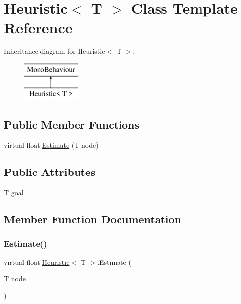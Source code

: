 \hypertarget{class_heuristic}{}\section{Heuristic$<$ T $>$ Class Template Reference}
\label{class_heuristic}
Inheritance diagram for Heuristic$<$ T $>$\+:\begin{figure}[H]
\begin{center}
\leavevmode
\includegraphics[height=2.000000cm]{class_heuristic}
\end{center}
\end{figure}
\subsection*{Public Member Functions}
\begin{DoxyCompactItemize}
\item 
virtual float \mbox{\hyperlink{class_heuristic_a89a45e2edf451260032d107d6118ac04}{Estimate}} (T node)
\end{DoxyCompactItemize}
\subsection*{Public Attributes}
\begin{DoxyCompactItemize}
\item 
T \mbox{\hyperlink{class_heuristic_a9b7078c615bf30ac77f026a737d6169a}{goal}}
\end{DoxyCompactItemize}


\subsection{Member Function Documentation}
\mbox{\label{class_heuristic_a89a45e2edf451260032d107d6118ac04}} 
\subsubsection{\texorpdfstring{Estimate()}{Estimate()}}
{\footnotesize\ttfamily virtual float \mbox{\hyperlink{class_heuristic}{Heuristic}}$<$ T $>$.Estimate (\begin{DoxyParamCaption}\item[{T}]{node }\end{DoxyParamCaption})\hspace{0.3cm}{\ttfamily [virtual]}}



